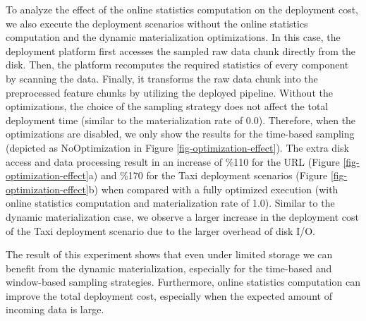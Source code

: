 To analyze the effect of the online statistics computation on the deployment cost, we also execute the deployment scenarios without the online statistics computation and the dynamic materialization optimizations.
In this case, the deployment platform first accesses the sampled raw data chunk directly from the disk.
Then, the platform recomputes the required statistics of every component by scanning the data.
Finally, it transforms the raw data chunk into the preprocessed feature chunks by utilizing the deployed pipeline.
Without the optimizations, the choice of the sampling strategy does not affect the total deployment time (similar to the materialization rate of 0.0).
Therefore, when the optimizations are disabled, we only show the results for the time-based sampling (depicted as NoOptimization in Figure \ref{fig-optimization-effect}).
The extra disk access and data processing result in an increase of \%110 for the URL (Figure \ref{fig-optimization-effect}a) and \%170 for the Taxi deployment scenarios (Figure \ref{fig-optimization-effect}b) when compared with a fully optimized execution (with online statistics computation and materialization rate of 1.0).
Similar to the dynamic materialization case, we observe a larger increase in the deployment cost of the Taxi deployment scenario due to the larger overhead of disk I/O.

The result of this experiment shows that even under limited storage we can benefit from the dynamic materialization, especially for the time-based and window-based sampling strategies.
Furthermore, online statistics computation can improve the total deployment cost, especially when the expected amount of incoming data is large.

